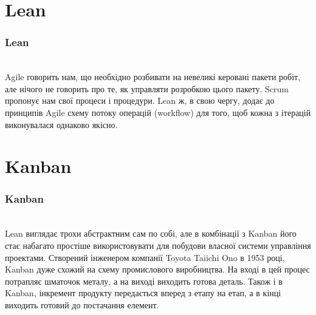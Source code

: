 \documentclass{beamer}
\begin{document}
\section{Lean}
\begin{frame}
\frametitle{Lean}
\\
  Agile говорить нам, що необхідно розбивати на невеликі керовані пакети робіт, але нічого не говорить про те, як управляти розробкою цього пакету. Scrum пропонує нам свої процеси і процедури. Lean ж, в свою чергу, додає до принципів Agile схему потоку операцій (workflow) для того, щоб кожна з ітерацій виконувалася однаково якісно.
\end{frame}



\section{Kanban}
\begin{frame}
\frametitle{Kanban}
\\
Lean виглядає трохи абстрактним сам по собі, але в комбінації з Kanban його стає набагато простіше використовувати для побудови власної системи управління проектами. Створений інженером компанії Toyota Taiichi Ono в 1953 році, Kanban дуже схожий на схему промислового виробництва. На вході в цей процес потрапляє шматочок металу, а на виході виходить готова деталь. Також і в Kanban, інкремент продукту передається вперед з етапу на етап, а в кінці виходить готовий до постачання елемент.
\end{frame}
\end{document}
